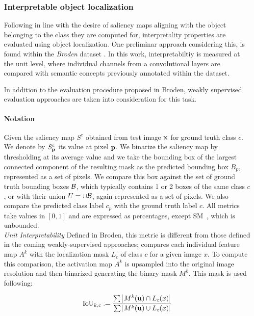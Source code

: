 \subsubsection{Interpretable object localization}
\label{sec:loc-metrics}
Following in line with the desire of saliency maps aligning with the object belonging to the class 
they are computed for, interpretality properties are evaluated using object localization.
One preliminar approach considering this, is found within the \emph{Broden} dataset 
\autocite{bau2017network}. In this work, interpretabiltiy is measured at the unit level, where 
individual channels from a convolutional layers are compared with semantic concepts previously 
annotated within the dataset. 

\noindent In addition to the evaluation procedure proposed in Broden, weakly supervised evaluation 
approaches are taken into consideration for this task. 

\paragraph{Notation} Given the saliency map $S^c$ obtained from test image $\mathbf{x}$ for ground truth 
class $c$. We denote by $S^c_{\mathbf{p}}$ its value at pixel $\mathbf{p}$. We binarize the saliency map by 
thresholding at its average value and we take the bounding box of the largest connected component 
of the resulting mask as the predicted bounding box $B_p$, represented as a set of pixels. We 
compare this box against the set of ground truth bounding boxes $\mathcal{B}$, which typically contains 1 
or 2 boxes of the same class $c$, or with their union $U = \cup \mathcal{B}$, again represented as a set 
of pixels. We also compare the predicted class label $c_p$ with the ground truth label $c$. All 
metrics take values in $[0,1]$ and are expressed as percentages, except SM~, which is 
unbounded.\\

\noindent \emph{Unit Interpretability} Defined in Broden, this metric is different from those 
defined in the coming weakly-supervised approaches; compares each individual feature map $A^k$ 
with the localization mask $L_c$ of class $c$ for a given image $x$. To compute this comparison, 
the activation map $A^k$ is upsampled into the original image resolution and then binarized 
generating the binary mask $M^k$. This mask is used following:

\begin{equation}
	\operatorname{IoU}_{k,c} \mathrel{:=} \frac{\sum \abs{M^k(\mathbf{u}) \cap L_c(x)}}
					      {\sum \abs{M^k(\mathbf{u}) \cup L_c(x)}}
\end{equation}

